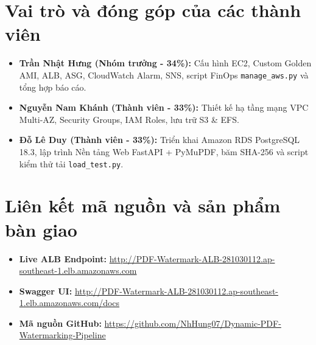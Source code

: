 \documentclass[12pt,a4paper]{report}
\begin{document}
\section{Vai trò và đóng góp của các thành viên}
\begin{itemize}
    \item \textbf{Trần Nhật Hưng (Nhóm trưởng - 34\%):} Cấu hình EC2, Custom Golden AMI, ALB, ASG, CloudWatch Alarm, SNS, script FinOps \texttt{manage\_aws.py} và tổng hợp báo cáo.
    \item \textbf{Nguyễn Nam Khánh (Thành viên - 33\%):} Thiết kế hạ tầng mạng VPC Multi-AZ, Security Groups, IAM Roles, lưu trữ S3 \& EFS.
    \item \textbf{Đỗ Lê Duy (Thành viên - 33\%):} Triển khai Amazon RDS PostgreSQL 18.3, lập trình Nền tảng Web FastAPI + PyMuPDF, băm SHA-256 và script kiểm thử tải \texttt{load\_test.py}.
\end{itemize}

\section{Liên kết mã nguồn và sản phẩm bàn giao}
\begin{itemize}
    \item \textbf{Live ALB Endpoint:} \url{http://PDF-Watermark-ALB-281030112.ap-southeast-1.elb.amazonaws.com}
    \item \textbf{Swagger UI:} \url{http://PDF-Watermark-ALB-281030112.ap-southeast-1.elb.amazonaws.com/docs}
    \item \textbf{Mã nguồn GitHub:} \url{https://github.com/NhHung07/Dynamic-PDF-Watermarking-Pipeline}
\end{itemize}
\end{document}

